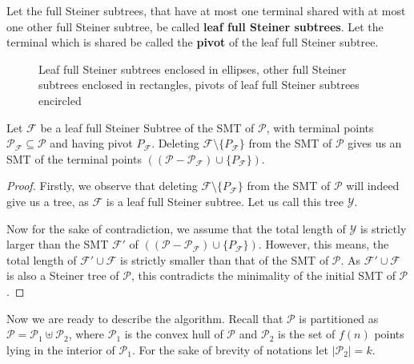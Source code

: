 \begin{definition}
Let the full Steiner subtrees, that have at most one terminal shared with at most one other full Steiner subtree, be called \textbf{leaf full Steiner subtrees}. Let the terminal which is shared be called the \textbf{pivot} of the leaf full Steiner subtree.
\end{definition}


\begin{figure}[h]
\centering
{}
    \qquad
{}
\caption{Leaf full Steiner subtrees enclosed in ellipses, other full Steiner subtrees enclosed in rectangles, pivots of leaf full Steiner subtrees encircled}
\end{figure}


\begin{lemma}
\label{leaf_non_leaf_structure}
Let $\mathcal F$ be a leaf full Steiner Subtree of the SMT of $\mathcal P$, with terminal points $\mathcal P_{\mathcal{\mathcal F}} \subseteq \mathcal{P}$ and having pivot $P_{\mathcal F}$. Deleting $\mathcal F\setminus \{P_{\mathcal F}\}$ from the SMT of $\mathcal P$ gives us an SMT of the terminal points $((\mathcal P - \mathcal{P}_{\mathcal F}) \cup \{P_{\mathcal F}\})$.
\end{lemma}

\begin{proof}
Firstly, we observe that deleting $\mathcal F\setminus \{P_{\mathcal F}\}$ from the SMT of $\mathcal P$ will indeed give us a tree, as $\mathcal F$ is a leaf full Steiner subtree. Let us call this tree $\mathcal Y$.

Now for the sake of contradiction, we assume that the total length of $\mathcal Y$ is strictly larger than the SMT $\mathcal F'$ of $((\mathcal P - \mathcal{P}_{\mathcal F}) \cup \{P_{\mathcal F}\})$. However, this means, the total length of $\mathcal F' \cup \mathcal F$ is strictly smaller than that of the SMT of $\mathcal P$. As $\mathcal F' \cup \mathcal F$ is also a Steiner tree of $\mathcal P$,  this contradicts the minimality of the initial SMT of $\mathcal P$.
\end{proof}

Now we are ready to describe the algorithm. Recall that $\mathcal P$ is partitioned as $\mathcal P = \mathcal{P}_1 \uplus \mathcal{P}_2$, where $\mathcal{P}_1$ is the convex hull of $\mathcal P$ and $\mathcal{P}_2$ is the set of $f(n)$ points lying in the interior of $\mathcal P_1$. For the sake of brevity of notations let $|\mathcal{P}_2| = k$.

